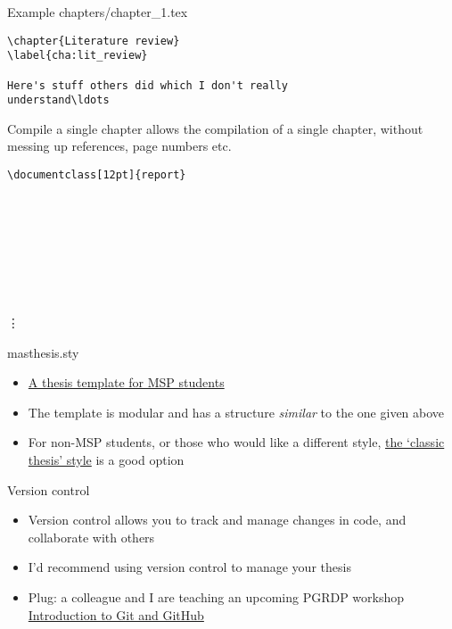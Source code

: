 \begin{frame}[fragile]{Example chapters/chapter\_1.tex}
  \begin{lstlisting}
\chapter{Literature review}
\label{cha:lit_review}

Here's stuff others did which I don't really
understand\ldots
  \end{lstlisting}
\end{frame}

\begin{frame}[fragile]{Compile a single chapter}
  \lstinline|| allows the compilation of a single chapter,
  without messing up references, page numbers etc.
  \begin{lstlisting}
\documentclass[12pt]{report}









  \end{lstlisting}
  \vspace{-0.2cm}\vdots
\end{frame}

\begin{frame}{masthesis.sty}
  \begin{itemize}
    \item \href{https://wiki.mas.ncl.ac.uk/mas/ThesisTemplate?highlight=\%28masthesis\%29}%
      {A thesis template for MSP students}
    \item The template is modular and has a structure \emph{similar} to the one
      given above
    \item For non-MSP students, or those who would like a different style, 
      \href{https://ctan.org/pkg/classicthesis?lang=en}%
      {the `classic thesis' style} is a good option
  \end{itemize}
\end{frame}

\begin{frame}{Version control}
  \begin{itemize}
    \item Version control allows you to track and manage changes in code, and
      collaborate with others
    \item I'd recommend using version control to manage your thesis
    \item Plug: a colleague and I are teaching an upcoming PGRDP workshop
      \href{https://workshops.ncl.ac.uk/view/book/modal/43153/}%
      {Introduction to Git and GitHub}
  \end{itemize}
\end{frame}


